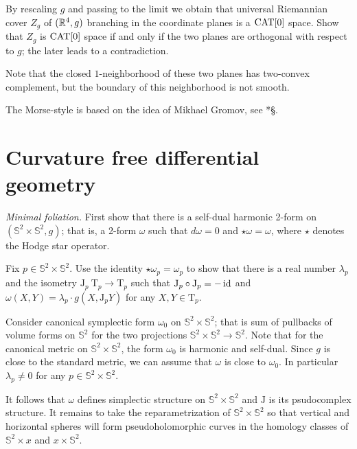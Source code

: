 By rescaling $g$ and passing to the limit we obtain that universal Riemannian cover $Z_g$ of $(\mathbb{R}^4,g)$ branching in the coordinate planes is a $\operatorname{\rm CAT}\nolimits[0]$ space.
Show that $Z_g$ is $\operatorname{\rm CAT}\nolimits[0]$ space if and only if the two planes are orthogonal with respect to $g$;
the later leads to a contradiction.

Note that the closed $1$-neighborhood of these two planes has two-convex complement, but the boundary of this neighborhood is not smooth.

The Morse-style is based on the idea of Mikhael Gromov, see \cite{gromov-SGMC}*{\S\textonehalf}.

\section*{Curvature free differential geometry}

\textit{Minimal foliation.}
First show that there is a self-dual harmonic 2-form on $(\mathbb{S}^2\times\mathbb{S}^2,g)$;
that is, a 2-form $\omega$ such that $d\omega=0$ and $\star\omega=\omega$,
where $\star$ denotes the Hodge star operator.

Fix $p\in \mathbb{S}^2\times\mathbb{S}^2$.
Use the identity $\star\omega_p=\omega_p$
to show that
there is a real number $\lambda_p$ and the isometry $\mathrm{J}_p\:\mathrm{T}_p\to\mathrm{T}_p$ 
such that
$\mathrm{J}_p\circ\mathrm{J}_p =-\operatorname{\rm id}$ 
and 
$\omega(X,Y)=\lambda_p\cdot g(X,\mathrm{J}_pY)$ for any $X,Y\in \mathrm{T}_p$.

Consider canonical symplectic form $\omega_0$ on $\mathbb{S}^2\times\mathbb{S}^2$;
that is sum of pullbacks of volume forms on $\mathbb{S}^2$  
for the two projections $\mathbb{S}^2\times\mathbb{S}^2\to \mathbb{S}^2$.
Note that for the canonical metric on $\mathbb{S}^2\times\mathbb{S}^2$,
the form $\omega_0$ is harmonic and self-dual. 
Since $g$ is close to the standard metric,
we can assume that $\omega$ is close to $\omega_0$.
In particular $\lambda_p\ne0$ for any $p\in \mathbb{S}^2\times\mathbb{S}^2$.

It follows that $\omega$ defines simplectic structure on $\mathbb{S}^2\times\mathbb{S}^2$
and $\mathrm{J}$ is its psudocomplex structure.
It remains to take the reparametrization of $\mathbb{S}^2\times \mathbb{S}^2$
so that vertical and horizontal spheres will form pseudoholomorphic curves in the homology classes of $\mathbb{S}^2\times x$ and $x\times \mathbb{S}^2$.
 
